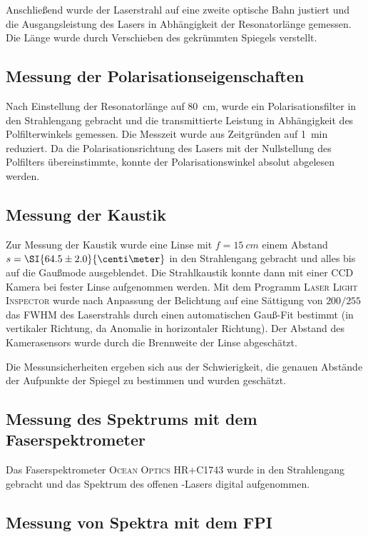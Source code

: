 \documentclass[slug=GL, room=HZDR\ Dresden/Rossendorf\,\ Geb.\ 620/123, supervisor=Tim\ Ziegler]{../../Lab_Report_LaTeX/lab_report}
\newcommand{\hne}{\ce{HeNe}-Laser}
\begin{document}
Anschlie\ss{}end wurde der Laserstrahl auf eine zweite optische Bahn
justiert und die Ausgangsleistung des Lasers in Abh\"angigkeit der
Resonatorl\"ange gemessen. Die L\"ange wurde durch Verschieben des
gekr\"ummten Spiegels verstellt.

\subsection{Messung der Polarisationseigenschaften}
\label{sec:poleig}

Nach Einstellung der Resonatorl\"ange auf \SI{80}{\centi\meter}, wurde
ein Polarisationsfilter in den Strahlengang gebracht und die
transmittierte Leistung in Abh\"angigkeit des Polfilterwinkels
gemessen.
Die Messzeit wurde aus Zeitgr\"unden auf \SI{1}{\minute} reduziert.
Da die Polarisationsrichtung des Lasers mit der Nullstellung des
Polfilters \"ubereinstimmte, konnte der Polarisationswinkel absolut
abgelesen werden.

\subsection{Messung der Kaustik}
\label{sec:messkaus}

Zur Messung der Kaustik wurde eine Linse mit \(f=\SI{15}{cm}\)
einem Abstand \(s=\SI{64.5\pm 2.0}{\centi\meter}\) in den Strahlengang
gebracht und alles bis auf die Gau\ss{}mode ausgeblendet. Die
Strahlkaustik konnte dann mit einer CCD Kamera bei fester Linse
aufgenommen werden. Mit dem Programm \textsc{Laser Light Inspector}
wurde nach Anpassung der Belichtung auf eine S\"attigung von
\(200/255\) das FWHM des Laserstrahls durch einen automatischen
Gauß-Fit bestimmt (in vertikaler Richtung, da Anomalie in
horizontaler Richtung). Der Abstand des Kamerasensors wurde durch die
Brennweite der Linse abgesch\"atzt.

Die Messunsicherheiten ergeben sich aus der Schwierigkeit, die genauen
Abst\"ande der Aufpunkte der Spiegel zu bestimmen und wurden
gesch\"atzt.

\subsection{Messung des Spektrums mit dem Faserspektrometer}
\label{sec:faser}

Das Faserspektrometer \textsc{Ocean Optics HR+C1743} wurde in den
Strahlengang gebracht und das Spektrum des offenen \hne{}s digital aufgenommen.

\subsection{Messung von Spektra mit dem FPI}
\label{sec:kalibzeit}
\end{document}
